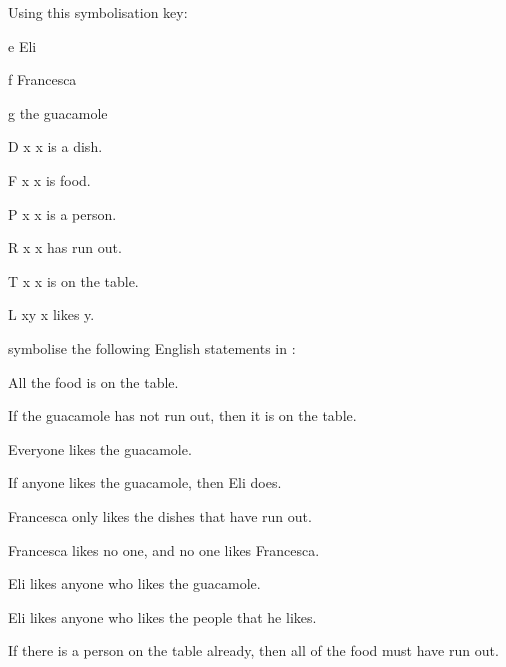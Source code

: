 \documentclass[PHIL101-Textbook.tex]{subfiles}
\begin{document}
\noindent\problempart
Using this symbolisation key:
\begin{ekey}
\item[e] Eli
\item[f] Francesca
\item[g] the guacamole
\item[\atom D x ] x is a dish.
\item[\atom F x ] x is food.
\item[\atom P x ] x is a person.
\item[\atom R x ] x has run out.
\item[\atom T x] x is on the table.
\item[\atom L xy ] x likes y.
\end{ekey}
symbolise the following English statements in \pl:
\begin{earg}
\item All the food is on the table.
\item If the guacamole has not run out, then it is on the table.
\item Everyone likes the guacamole.
\item If anyone likes the guacamole, then Eli does.
\item Francesca only likes the dishes that have run out.
\item Francesca likes no one, and no one likes Francesca.
\item Eli likes anyone who likes the guacamole.
\item Eli likes anyone who likes the people that he likes.
\item If there is a person on the table already, then all of the food must have run out.
\end{earg}
\end{document}
